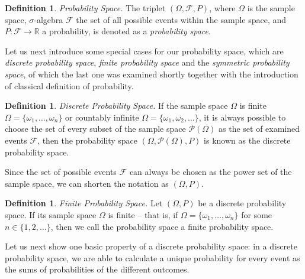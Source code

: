 \documentclass[12pt,a4paper,leqno]{report}
\newcommand{\R}{\mathbb{R}}
\newcommand{\F}{\mathcal{F}}
\theoremstyle{plain}
\theoremstyle{definition}
\newtheorem{maar}[equation]{Definition}
\begin{document}
\begin{maar}
\emph{Probability Space.} The triplet $(\Omega, \F, P)$, where $\Omega$ is the sample space, $\sigma$-algebra $\F$ the set of all possible events within the sample space, and $P: \F \rightarrow \R$ a probability, is denoted as a \emph{probability space}.
\end{maar}

Let us next introduce some special cases for our probability space, which are \emph{discrete probability space}, \emph{finite probability space} and the \emph{symmetric probability space}, of which the last one was examined shortly together with the introduction of classical definition of probability.

\begin{maar}
\emph{Discrete Probability Space.} If the sample space $\Omega$ is finite $\Omega = \{\omega_1, \dots , \omega_n\}$ or countably infinite $\Omega = \{\omega_1, \omega_2, \dots \}$,
it is always possible to choose the set of every subset of the sample space $\mathcal{P}(\Omega)$ as the set of examined events $\F$, then the probability space $(\Omega, \mathcal{P}(\Omega), P)$ is known as the discrete probability space.

Since the set of possible events $\F$ can always be chosen as the power set of the sample space, we can shorten the notation as $(\Omega, P)$.
\end{maar}

\bigskip

\begin{maar}
\emph{Finite Probability Space.} Let $(\Omega, P)$ be a discrete probability space. If its sample space $\Omega$ is finite -- that is, if $\Omega = \{\omega_1, \dots , \omega_n\}$ for some $n \in \{1,2, \dots\}$, then we call the probability space a finite probability space.
\end{maar}

Let us next show one basic property of a discrete probability space: in a discrete probability space, we are able to calculate a unique probability for every event as the sums of probabilities of the different outcomes.
\end{document}
